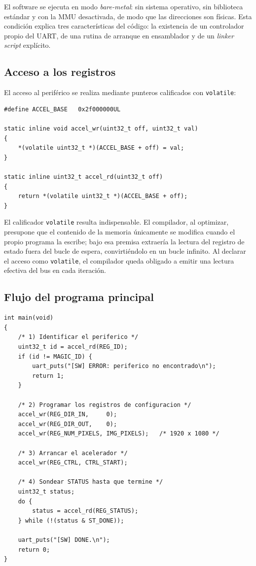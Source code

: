 \documentclass[11pt,letterpaper]{article}
\begin{document}
El software se ejecuta en modo \emph{bare-metal}: sin sistema operativo, sin
biblioteca estándar y con la MMU desactivada, de modo que las direcciones son
físicas. Esta condición explica tres características del código: la existencia
de un controlador propio del UART, de una rutina de arranque en ensamblador y de
un \emph{linker script} explícito.

\subsection{Acceso a los registros}

El acceso al periférico se realiza mediante punteros calificados con
\texttt{volatile}:

\begin{lstlisting}[style=cstyle,caption={Accesores MMIO (\texttt{sw/accel.h}).}]
#define ACCEL_BASE   0x2f000000UL

static inline void accel_wr(uint32_t off, uint32_t val)
{
    *(volatile uint32_t *)(ACCEL_BASE + off) = val;
}

static inline uint32_t accel_rd(uint32_t off)
{
    return *(volatile uint32_t *)(ACCEL_BASE + off);
}
\end{lstlisting}

El calificador \texttt{volatile} resulta indispensable. El compilador, al
optimizar, presupone que el contenido de la memoria únicamente se modifica
cuando el propio programa la escribe; bajo esa premisa extraería la lectura del
registro de estado fuera del bucle de espera, convirtiéndolo en un bucle
infinito. Al declarar el acceso como \texttt{volatile}, el compilador queda
obligado a emitir una lectura efectiva del bus en cada iteración.

\subsection{Flujo del programa principal}

\begin{lstlisting}[style=cstyle,caption={Programa principal (\texttt{sw/main.c}), estructura.}]
int main(void)
{
    /* 1) Identificar el periferico */
    uint32_t id = accel_rd(REG_ID);
    if (id != MAGIC_ID) {
        uart_puts("[SW] ERROR: periferico no encontrado\n");
        return 1;
    }

    /* 2) Programar los registros de configuracion */
    accel_wr(REG_DIR_IN,     0);
    accel_wr(REG_DIR_OUT,    0);
    accel_wr(REG_NUM_PIXELS, IMG_PIXELS);   /* 1920 x 1080 */

    /* 3) Arrancar el acelerador */
    accel_wr(REG_CTRL, CTRL_START);

    /* 4) Sondear STATUS hasta que termine */
    uint32_t status;
    do {
        status = accel_rd(REG_STATUS);
    } while (!(status & ST_DONE));

    uart_puts("[SW] DONE.\n");
    return 0;
}
\end{lstlisting}
\end{document}
